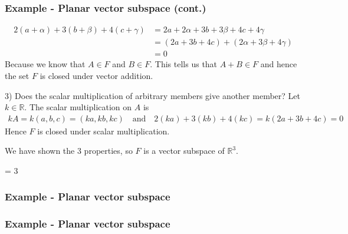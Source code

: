 \documentclass[usenames,dvipsnames,aspectratio=169,10pt]{beamer}
\def \EXAMPLEVERSION {1} %
\numberwithin{equation}{section}
\begin{document}
\begin{frame}
\frametitle{Example - Planar vector subspace (cont.)}
\vspace{-0.7cm}
\begin{align*}
2(a+\alpha) + 3(b+\beta) + 4(c+\gamma) &= 2a+2\alpha + 3b+3\beta + 4c+4\gamma \\
&= \left(2a+3b+4c\right) + \left(2\alpha + 3\beta + 4\gamma\right) \\
&= 0
\end{align*}
Because we know that $A\in F$ and $B\in F$. This tells us that $A+B \in F$ and hence the set $F$ is closed under vector addition.

3) Does the scalar multiplication of arbitrary members give another member? Let $k\in\mathbb{R}$. The scalar multiplication on $A$ is
\begin{align*}
kA = k(a,b,c)=(ka,kb,kc) \quad\text{and}\quad 2(ka)+3(kb)+4(kc) = k(2a+3b+4c)=0
\end{align*}
Hence $F$ is closed under scalar multiplication.

We have shown the 3 properties, so $F$ is a vector subspace of $\mathbb{R}^3$.
\end{frame}
\fi


\ifnum \EXAMPLEVERSION = 3
\begin{frame}
\frametitle{Example - Planar vector subspace}
\end{frame}

\begin{frame}
\frametitle{Example - Planar vector subspace}
\end{frame}
\fi
\end{document}
